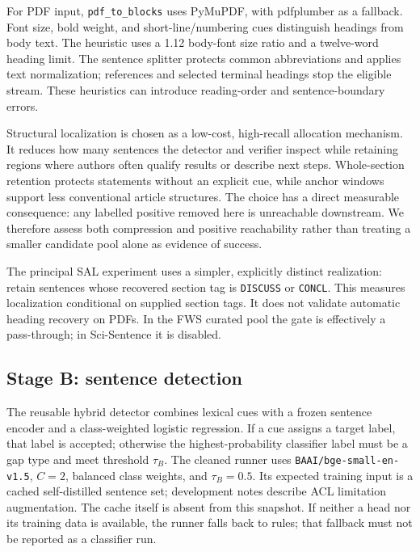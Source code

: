 For PDF input, \texttt{pdf\_to\_blocks} uses PyMuPDF, with pdfplumber as a fallback. Font size,
bold weight, and short-line/numbering cues distinguish headings from body text. The heuristic
uses a 1.12 body-font size ratio and a twelve-word heading limit. The sentence splitter protects
common abbreviations and applies text normalization; references and selected terminal headings
stop the eligible stream. These heuristics can introduce reading-order and sentence-boundary errors.

Structural localization is chosen as a low-cost, high-recall allocation mechanism. It reduces
how many sentences the detector and verifier inspect while retaining regions where authors often
qualify results or describe next steps. Whole-section retention protects statements without an
explicit cue, while anchor windows support less conventional article structures. The choice has
a direct measurable consequence: any labelled positive removed here is unreachable downstream.
We therefore assess both compression and positive reachability rather than treating a smaller
candidate pool alone as evidence of success.

The principal SAL experiment uses a simpler, explicitly distinct realization: retain sentences
whose recovered section tag is \texttt{DISCUSS} or \texttt{CONCL}. This measures localization
conditional on supplied section tags. It does not validate automatic heading recovery on PDFs.
In the FWS curated pool the gate is effectively a pass-through; in Sci-Sentence it is disabled.

\subsection{Stage B: sentence detection}
\label{S:stage-b}
\label{S:pipeline}

The reusable hybrid detector combines lexical cues with a frozen sentence encoder and a
class-weighted logistic regression. If a cue assigns a target label, that label is accepted;
otherwise the highest-probability classifier label must be a gap type and meet threshold
$\tau_B$. The cleaned runner uses \texttt{BAAI/bge-small-en-v1.5}, $C=2$, balanced class weights,
and $\tau_B=0.5$. Its expected training input is a cached self-distilled sentence set; development
notes describe ACL limitation augmentation. The cache itself is absent from this snapshot. If neither a head nor its training data is available, the runner falls back to
rules; that fallback must not be reported as a classifier run.

